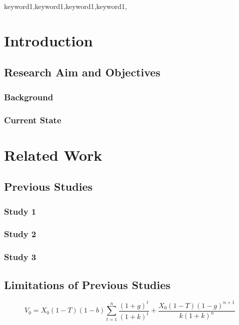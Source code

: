 \documentclass[
    writingLanguage=english, 
    addPageTitle=yes,
    AddDeclaration=yes,
    addMUSTlog=no,
    refUnindent=yes,
    printing=no,
]{.def/must}
\begin{document}
\begin{abstract@en}{keyword1,keyword1,keyword1,keyword1,}
\end{abstract@en}

\addtableofcontents


\chapter{Introduction}
\section{Research Aim and Objectives}
\subsection{Background}
\citep{abdoh2019, bordwell2013, bourdieu1990, cole1992, harvey2007, johnson2018, macdonald2020, manguel2009b, milliot9999, poff2019, villazón2011, manguel2009a}

\subsection{Current State}

\chapter{Related Work}
\section{Previous Studies}
\subsection{Study 1}
\subsection{Study 2}
\subsection{Study 3}
\section{Limitations of Previous Studies}

\begin{equation}
V_0=X_0(1-T)(1-b) \sum_{t=1}^n \frac{(1+g)^t}{(1+k)^t}+\frac{X_0(1-T)(1-g)^{n+1}}{k(1+k)^n}
\end{equation}
\end{document}
